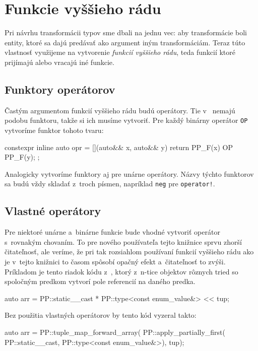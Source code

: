 \section{Funkcie vyššieho rádu} \label{hof}

Pri návrhu transformácii typov sme dbali na jednu vec: aby transformácie boli entity, ktoré sa dajú predávať ako argument iným transformáciám. Teraz túto vlastnosť využijeme na vytvorenie \emph{funkcií vyššieho rádu}, teda funkcií ktoré prijímajú alebo vracajú iné funkcie.

\subsection{Funktory operátorov}

Častým argumentom funkcií vyššieho rádu budú operátory. Tie v~\Cpp{} nemajú podobu funktoru, takže si ich musíme vytvoriť. Pre každý binárny operátor \texttt{OP} vytvoríme funktor tohoto tvaru:
\begin{code}
constexpr inline auto opr = [](auto&& x, auto&& y)
                            { return PP_F(x) OP PP_F(y); };
\end{code}
Analogicky vytvoríme funktory aj pre unárne operátory. Názvy týchto funktorov sa budú vždy skladať z~troch písmen, napríklad \texttt{neg} pre \texttt{operator!}.

\subsection{Vlastné operátory}

Pre niektoré unárne a~binárne funkcie bude vhodné vytvoriť operátor s~rovnakým chovaním. To pre nového používateľa tejto knižnice sprvu zhorší čitateľnosť, ale veríme, že pri tak rozsiahlom používaní funkcií vyššieho rádu ako je v~tejto knižnici to časom spôsobí opačný efekt a~čitateľnosť to zvýši. Príkladom je tento riadok kódu z~\PPreflection{}, ktorý z~n-tice objektov rôznych tried so spoločným predkom vytvorí pole referencií na daného predka.
\begin{code}
auto arr = PP::static__cast * PP::type<const enum_value&> << tup;
\end{code}
Bez použitia vlastných operátorov by tento kód vyzeral takto:
\begin{code}
auto arr = PP::tuple_map_forward_array(
    PP::apply_partially_first(
        PP::static__cast, PP::type<const enum_value&>),
    tup);
\end{code}

